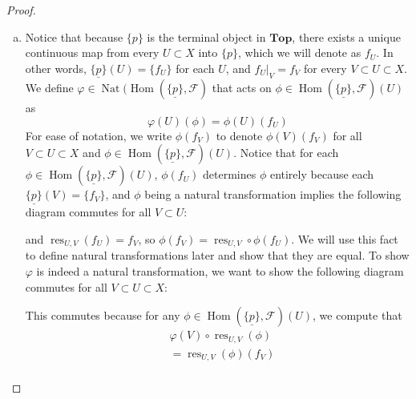 \documentclass{article}
\newcommand{\fF}{\mathscr{F}}
\DeclareMathOperator{\res}{res}
\DeclareMathOperator{\Hom}{Hom}
\DeclareMathOperator{\Nat}{Nat}
\newcommand{\Top}{\mathbf{Top}} %
\begin{document}
\begin{proof}
    \begin{enumerate}[(a)]
        \item Notice that because $\{p\}$ is the terminal object in $\Top$, there exists a unique continuous map from every $U\subset X$ into $\{p\}$, which we will denote as $f_U$. In other words, $\underline{\{p\}}(U)=\{f_U\}$ for each $U$, and $f_U\vert_{V}=f_V$ for every $V\subset U\subset X$. We define $\varphi\in \Nat(\Hom(\underline{\{p\}},\fF)$ that acts on $\phi \in \Hom(\underline{\{p\}},\fF)(U)$ as 
        \[
        \varphi(U)(\phi)=\phi(U)(f_U)
        \]
        For ease of notation, we write $\phi(f_V)$ to denote $\phi(V)(f_V)$ for all $V\subset U\subset X$ and $\phi\in \Hom(\underline{\{p\}},\fF)(U)$. Notice that for each $\phi \in \Hom(\underline{\{p\}},\fF)(U)$, $\phi(f_U)$ determines $\phi$ entirely because each $\underline{\{p\}}(V)=\{f_V\}$, and $\phi$ being a natural transformation implies the following diagram commutes for all $V\subset U$:
        \begin{center}
        \end{center}
        and $\res_{U,V}(f_U)=f_V$, so $\phi(f_V)=\res_{U,V}\circ \phi(f_U)$. We will use this fact to define natural transformations later and show that they are equal. To show $\varphi$ is indeed a natural transformation, we want to show the following diagram commutes for all $V\subset U\subset X$:
        \begin{center}
        \end{center}
        This commutes because for any $\phi\in \Hom(\underline{\{p\}},\fF)(U)$, we compute that
        \begin{align*}
            &\varphi(V)\circ \res_{U,V}(\phi)\\
            &= \res_{U,V}(\phi)(f_V)\\

\end{align*}
\end{enumerate}
\end{proof}
\end{document}

